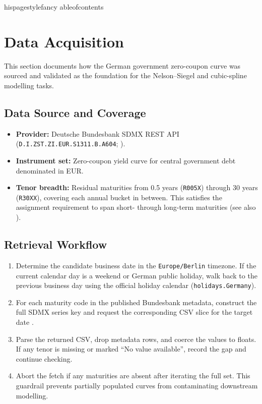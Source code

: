 \documentclass[12pt]{article}
\author{}
\date{}
\newcommand{\inlinecode}[1]{\texttt{#1}}
\begin{document}
\maketitle
	hispagestyle{fancy}
	ableofcontents
\bigskip

\section{Data Acquisition}
\begin{spacing}{1.15}
This section documents how the German government zero-coupon curve was sourced and validated as the foundation for the Nelson--Siegel and cubic-spline modelling tasks.

\subsection{Data Source and Coverage}
\begin{itemize}
    \item \textbf{Provider:} Deutsche Bundesbank SDMX REST API (\inlinecode{D.I.ZST.ZI.EUR.S1311.B.A604}; \citealp{bundesbank_zero_coupon}).
    \item \textbf{Instrument set:} Zero-coupon yield curve for central government debt denominated in EUR.
    \item \textbf{Tenor breadth:} Residual maturities from 0.5 years (\inlinecode{R005X}) through 30 years (\inlinecode{R30XX}), covering each annual bucket in between. This satisfies the assignment requirement to span short- through long-term maturities (see also \citealp{bundesbank_metadata}).
\end{itemize}

\subsection{Retrieval Workflow}
\begin{enumerate}
    \item Determine the candidate business date in the \inlinecode{Europe/Berlin} timezone. If the current calendar day is a weekend or German public holiday, walk back to the previous business day using the official holiday calendar (\inlinecode{holidays.Germany}).
    \item For each maturity code in the published Bundesbank metadata, construct the full SDMX series key and request the corresponding CSV slice for the target date \citep{bundesbank_metadata}.
    \item Parse the returned CSV, drop metadata rows, and coerce the values to floats. If any tenor is missing or marked ``No value available'', record the gap and continue checking.
    \item Abort the fetch if any maturities are absent after iterating the full set. This guardrail prevents partially populated curves from contaminating downstream modelling.
\end{enumerate}


\end{spacing}
\end{document}
